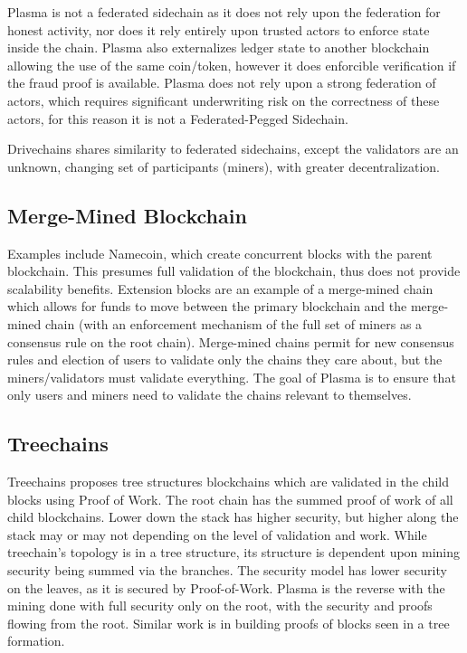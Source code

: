 \documentclass[letterpaper, 11pt]{article}
\begin{document}
Plasma is not a federated sidechain\cite{sidechains} as it does not rely upon
the federation for honest activity, nor does it rely entirely upon trusted
actors to enforce state inside the chain. Plasma also externalizes ledger state
to another blockchain allowing the use of the same coin/token, however it does
enforcible verification if the fraud proof is available. Plasma does not rely
upon a strong federation of actors, which requires significant underwriting
risk on the correctness of these actors, for this reason it is not a
Federated-Pegged Sidechain. 

Drivechains\cite{drivechains} shares similarity to federated sidechains, except
the validators are an unknown, changing set of participants (miners), with
greater decentralization.

\subsection{Merge-Mined Blockchain}

Examples include Namecoin, which create concurrent blocks with the parent
blockchain\cite{mergedmining}. This presumes full validation of the blockchain,
thus does not provide scalability benefits. Extension blocks are an example of
a merge-mined chain which allows for funds to move between the primary
blockchain and the merge-mined chain (with an enforcement mechanism of the full
set of miners as a consensus rule on the root chain). Merge-mined chains permit
for new consensus rules and election of users to validate only the chains they
care about, but the miners/validators must validate everything. The goal of
Plasma is to ensure that only users and miners need to validate the chains
relevant to themselves.

\subsection{Treechains}

Treechains\cite{treechains} proposes tree structures blockchains which are
validated in the child blocks using Proof of Work. The root chain has the
summed proof of work of all child blockchains. Lower down the stack has higher
security, but higher along the stack may or may not depending on the level of
validation and work. While treechain's topology is in a tree structure, its
structure is dependent upon mining security being summed via the branches. The
security model has lower security on the leaves, as it is secured by
Proof-of-Work. Plasma is the reverse with the mining done with full security
only on the root, with the security and proofs flowing from the root. Similar
work is in building proofs of blocks seen in a tree formation.
\end{document}
